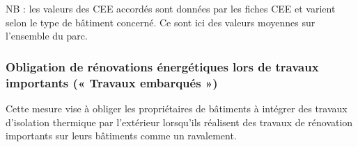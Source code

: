 \documentclass[10.5pt,a4paper]{article}
\begin{document}
{\begin{table}[h!] \caption{Valeurs moyennes des CEE en  kWh cumac par m² accordés par geste et système}

\footnotesize{NB : les valeurs des CEE accordés sont données par les fiches CEE et varient selon le type de bâtiment concerné. Ce sont ici des valeurs moyennes sur l’ensemble du parc. }
\end{table}

\subsubsection{Obligation de rénovations énergétiques lors de travaux importants (« Travaux embarqués »)}

Cette mesure vise à obliger les propriétaires de bâtiments à intégrer des travaux d'isolation thermique par l'extérieur lorsqu'ils réalisent des travaux de rénovation importants sur leurs bâtiments comme un ravalement. 

}
\end{document}
